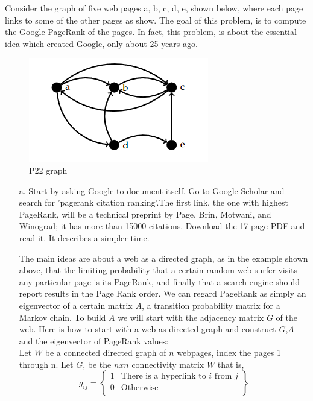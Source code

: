 \documentclass[12pt]{article}
\makeatletter
\theoremstyle{homework}
\newenvironment{exercise}[1]
{\def\@currentlabel{#1}\exercisecore}
{\endexercisecore}
\makeatother
\begin{document}
\begin{exercise}{P22} Consider the graph of five web pages a, b, c, d, e, shown below, where each page links to some of the other pages as show. The goal 
  of this problem, is to compute the Google PageRank of the pages. In fact, this problem, is about the essential idea which 
  created Google, only about 25 years ago. 
  \begin{figure}[H]
    \begin{center}
      \caption{P22 graph}
       \includegraphics[width=.5\textwidth]{fig1.png}
    \end{center}
  \end{figure}
\begin{enumerate}
  \item[a.] Start by asking Google to document itself. Go to Google Scholar and search for 'pagerank citation ranking'.The first link,  the one with highest PageRank,  will 
  be a technical preprint by Page, Brin, Motwani, and Winograd;  it has more than 15000 citations. Download the 17 page PDF and read it. It describes a simpler time. 
  
  The main ideas are about a 
  web as a directed graph, as in the example shown above, that the limiting probability that a certain random web surfer visits any particular page is its PageRank, and finally that a 
  search engine should report results in the Page Rank order. We can regard PageRank as simply an eigenvector of a certain matrix $A$, a transition probability matrix for a Markov chain. To 
  build $A$ we will start with the adjacency matrix $G$ of the web. Here is how to start with a web as directed graph and construct $G$,$A$ and the eigenvector of PageRank values: \\
  Let $W$ be a connected directed graph of $n$ webpages, index the pages 1 through n. Let $G$, be the $nxn$ connectivity matrix $W$ that is, 
  \begin{equation*}
    g_{ij} = 
    \left\{
      \begin{array}{ll}
            1 & \text{There is a hyperlink to $i$ from $j$} \\
            0 & \text{Otherwise} \\
      \end{array} 
      \right\}
  \end{equation*}


\end{enumerate}
\end{exercise}
\end{document}
